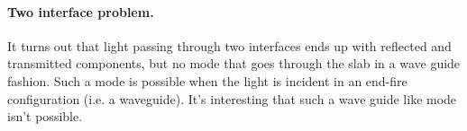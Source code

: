 %
%

\renewcommand{\basename}{emt10}
\renewcommand{\dirname}{notes/ece1228/}
\newcommand{\keywords}{ECE1228H}


\usepackage{peeters_braket}
\usepackage{peeters_figures}
\usepackage{mathtools}
\usepackage{siunitx}
\usepackage{macros_bm}

\beginArtNoToc
{}
\label{chap:emt10}

\paragraph{Two interface problem.}

It turns out that light passing through two interfaces ends up with reflected and transmitted components, but no mode that goes through the slab in a wave guide fashion.  Such a mode is possible when the light is incident in an end-fire configuration (i.e. a waveguide).  It's interesting that such a wave guide like mode isn't possible.

